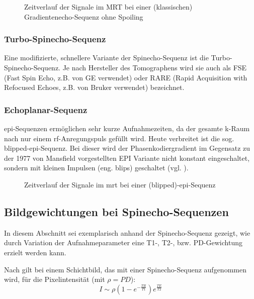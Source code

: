 \begin{figure}[H]
	\centering
	\caption[Gradientenecho-Sequenz]{Zeitverlauf der Signale im MRT bei einer (klassischen) Gradientenecho-Sequenz ohne Spoiling}
	\label{fig:GRE}
\end{figure}

\subsubsection{Turbo-Spinecho-Sequenz}
Eine modifizierte, schnellere Variante der Spinecho-Sequenz ist die Turbo-Spinecho-Sequenz. Je nach Hersteller des Tomographens wird sie auch als FSE (Fast Spin Echo, z.B. von GE verwendet) oder RARE (Rapid Acquisition with Refocused Echoes, z.B. von Bruker verwendet) bezeichnet.

\subsubsection{Echoplanar-Sequenz}
\gls{epi}-Sequenzen ermöglichen sehr kurze Aufnahmezeiten, da der gesamte k-Raum nach nur einem \gls{rf}-Anregungspuls gefüllt wird. Heute verbreitet ist die sog. blipped-\gls{epi}-Sequenz. Bei dieser wird der Phasenkodiergradient im Gegensatz zu der 1977 von Mansfield vorgestellten EPI Variante nicht konstant eingeschaltet, sondern mit kleinen Impulsen (eng. blips) geschaltet (vgl. \cite[S.~299]{Bushong2014}).

\begin{figure}[H]
	\centering
	\caption[Echoplanar Sequenz]{Zeitverlauf der Signale im \gls{mrt} bei einer (blipped)-\gls{epi}-Sequenz}
	\label{fig:EPIseq}
\end{figure}



\subsection{Bildgewichtungen bei Spinecho-Sequenzen}
\label{sec:gewichtung}
In diesem Abschnitt sei exemplarisch anhand der Spinecho-Sequenz gezeigt, wie durch Variation der Aufnahmeparameter eine T1-, T2-, bzw. PD-Gewichtung erzielt werden kann.

Nach \cite{Bushberg2011} gilt bei einem Schichtbild, das mit einer Spinecho-Sequenz aufgenommen wird, für die Pixelintensität (mit $\rho=PD$):
\begin{equation}
\label{eq:SEintensity}
	I \sim \rho \left(1-e^{-\frac{TR}{T1}}\right) e^{\frac{TE}{T2}}
\end{equation}

